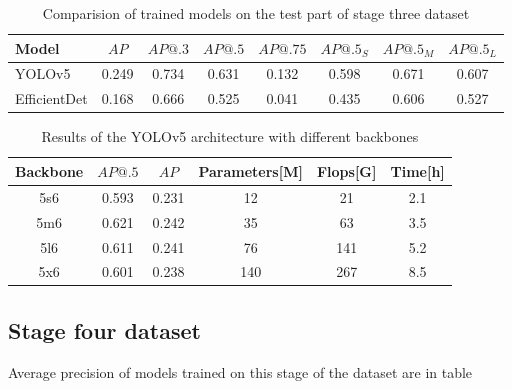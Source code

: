 \begin{table}[H]
    \centering
    \begin{tabular}{|l|c|c|c|c|c|c|c|}
        \hline
        Model        & $AP$  & $AP@.3$ & $AP@.5$ & $AP@.75$ & $AP@.5_S$ & $AP@.5_M$ & $AP@.5_L$ \\ \hline
        YOLOv5       & 0.249 & 0.734   & 0.631   & 0.132    & 0.598     & 0.671     & 0.607     \\ \hline
        EfficientDet & 0.168 & 0.666   & 0.525   & 0.041    & 0.435     & 0.606     & 0.527     \\ \hline
    \end{tabular}
    \caption{Comparision of trained models on the test part of stage three dataset}
    \label{tab:model_results:stage_three:test}
\end{table}

\begin{table}[H]
    \begin{tabular}{|c|c|c|c|c|c|}
        \hline
        Backbone & $AP@.5$ & $AP$  & Parameters[M] & Flops[G] & Time[h] \\ \hline
        5s6      & 0.593   & 0.231 & 12            & 21       & 2.1     \\ \hline
        5m6      & 0.621   & 0.242 & 35            & 63       & 3.5     \\ \hline
        5l6      & 0.611   & 0.241 & 76            & 141      & 5.2     \\ \hline
        5x6      & 0.601   & 0.238 & 140           & 267      & 8.5     \\ \hline
    \end{tabular}
    \caption{Results of the YOLOv5 architecture with different backbones}
    \label{tab:stage_three:yolov5_backbones}
\end{table}

\subsection{Stage four dataset}
Average precision of models trained on this stage of the dataset are in table

